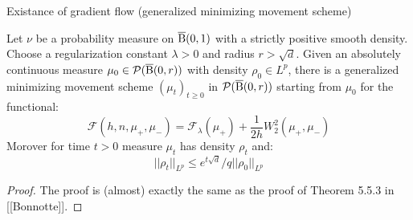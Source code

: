 Existance of gradient flow (generalized minimizing movement scheme)
\begin{thm} \label{thm:existance_gmm_scheme}
Let $\nu$ be a probability measure on $\operatorname{\overline{B}}(0,1)$ with a strictly positive smooth density. Choose a regularization constant $\lambda > 0$ and radius $r > \sqrt{d}$. Given an absolutely continuous measure $\mu_0 \in \mathcal{P}(\operatorname{\overline{B}}(0,r))$ with density $\rho_0 \in L^p$, there is a generalized minimizing movement scheme $(\mu_t)_{t\geq 0}$ in $\mathcal{P}(\operatorname{\overline{B}}(0,r))$ starting from $\mu_0$ for the functional:
\[
\mathcal{F}(h, n , \mu_+, \mu_-) = \mathcal{F}_{\lambda}(\mu_+) + \frac{1}{2h}W_2^2(\mu_+, \mu_-)
\]
Morover for time $t > 0$ measure $\mu_t$ has density $\rho_t$ and:
\[
||\rho_t||_{L^p} \leq e^{t\sqrt{d}}/q ||\rho_0||_{L^p}
\]
\end{thm}
\begin{proof}
The proof is (almost) exactly the same as the proof of Theorem 5.5.3 in [[Bonnotte]]. 
\end{proof}

